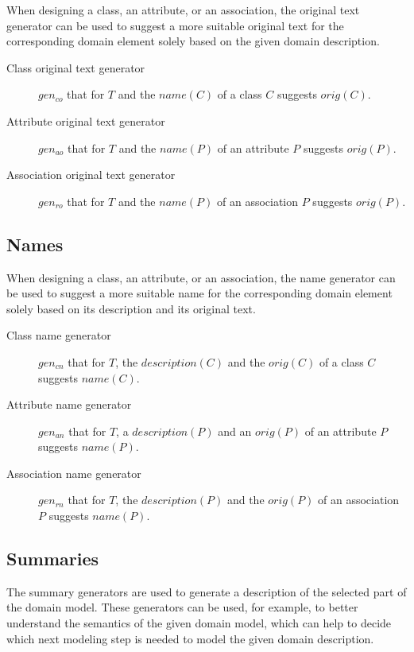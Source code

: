 When designing a class, an attribute, or an association, the original text generator can be used to suggest a more suitable original text for the corresponding domain element solely based on the given domain description.

\begin{description}
\item [Class original text generator] $gen_{co}$ that for $T$ and the $name(C)$ of a class $C$ suggests $orig(C)$.

\item [Attribute original text generator] $gen_{ao}$ that for $T$ and the $name(P)$ of an attribute $P$ suggests $orig(P)$.

\item [Association original text generator] $gen_{ro}$ that for $T$ and the $name(P)$ of an association $P$ suggests $orig(P)$.
\end{description}


\subsection{Names}

When designing a class, an attribute, or an association, the name generator can be used to suggest a more suitable name for the corresponding domain element solely based on its description and its original text.

\begin{description}
\item [Class name generator] $gen_{cn}$ that for $T$, the $description(C)$ and the $orig(C)$ of a class $C$ suggests  $name(C)$.

\item [Attribute name generator] $gen_{an}$ that for $T$,  a $description(P)$ and an $orig(P)$ of an attribute $P$ suggests $name(P)$.

\item [Association name generator] $gen_{rn}$ that for $T$, the $description(P)$ and the $orig(P)$ of an association $P$ suggests $name(P)$.
\end{description}


\subsection{Summaries}

The summary generators are used to generate a description of the selected part of the domain model. These generators can be used, for example, to better understand the semantics of the given domain model, which can help to decide which next modeling step is needed to model the given domain description.

